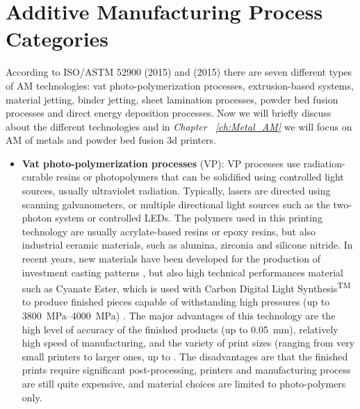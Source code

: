 \section{Additive Manufacturing Process Categories} 
\label{sec:AMproc}
According to ISO/ASTM 52900 \cite{international_standard_organization_isoastm_2015} (2015) and \citeauthor{gibson_additive_2015} (2015) there are seven different types of AM technologies: vat photo-polymerization processes, extrusion-based systems, material jetting, binder jetting, sheet lamination processes, powder bed fusion processes and direct energy deposition processes. Now we will briefly discuss about the different technologies and in \emph{Chapter~ \ref{ch:Metal_AM}} we will focus on AM of metals and powder bed fusion 3d printers.
\begin{itemize}
    \item \textbf{Vat photo-polymerization processes} (VP): VP processes use radiation-curable resins or photopolymers that can be solidified using controlled light sources, usually ultraviolet radiation. Typically, lasers are directed using scanning galvanometers, or multiple directional light sources such as the two-photon system or controlled LEDs. The polymers used in this printing technology are usually acrylate-based resins or epoxy resins, but also industrial ceramic materials, such as alumina, zirconia and silicone nitride. In recent years, new materials have been developed for the production of investment casting patterns \cite{3d_systems_investment_2023}, but also high technical performances material such as Cyanate Ester, which is used with Carbon Digital Light Synthesis\textsuperscript{TM} to produce finished pieces capable of withstanding high pressures (up to \SIrange[range-phrase = --]{3800}{4000}{\mega\pascal}) \cite{carbon_3d_carbon_2023}. The major advantages of this technology are the high level of accuracy of the finished products (up to \SI{0.05}{\milli\metre}), relatively high speed of manufacturing, and the variety of print sizes (ranging from very small printers to larger ones, up to . The disadvantages are that the finished prints require significant post-processing, printers and manufacturing process are still quite expensive, and material choices are limited to photo-polymers only.

\end{itemize}
